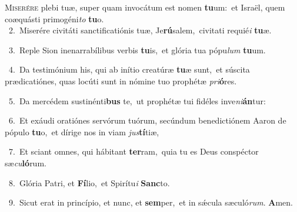 \lettrine{\initial\textcolor{\initialcolor}{M}}{iserére} plebi tuæ, super quam invocátum est nomen \textbf{tu}\-um:~\star et Israël, quem coæquásti primogéni\textit{to} \textbf{tu}\-o.\\
{\numbfont\textcolor{\numbcolor}{~2.}}~Miserére civitáti sanctificatiónis tuæ, Je\-\textbf{rú}\-salem,~\star civitati requié\textit{i} \textbf{tu}\-æ.\par
{\numbfont\textcolor{\numbcolor}{~3.}}~Reple Sion inenarrabílibus verbis \textbf{tu}\-is,~\star et glória tua pópu\textit{lum} \textbf{tu}\-um.\par
{\numbfont\textcolor{\numbcolor}{~4.}}~Da testimónium his, qui ab inítio creatúræ \textbf{tu}\-æ sunt,~\star et súscita prædicatiónes, quas locúti sunt in nómine tuo prophétæ \textit{pri}\-\textbf{ó}res.\par
{\numbfont\textcolor{\numbcolor}{~5.}}~Da mercédem sustinénti\textbf{bus} te,~\star ut prophétæ tui fidéles inve\-\textit{ni}\-\textbf{án}tur:\par
{\numbfont\textcolor{\numbcolor}{~6.}}~Et exáudi oratiónes servórum tuórum, secúndum benedictiónem Aaron de pópulo \textbf{tu}\-o,~\star et dírige nos in viam \textit{jus}\-\textbf{tí}tiæ,\par
{\numbfont\textcolor{\numbcolor}{~7.}}~Et sciant omnes, qui hábitant \textbf{ter}\-ram,~\star quia tu es Deus conspéctor sæ\-\textit{cu}\-\textbf{ló}rum.\par
{\numbfont\textcolor{\numbcolor}{~8.}}~Glória Patri, et \textbf{Fí}\-lio,~\star et Spirítu\textit{i} \textbf{Sanc}\-to.\par
{\numbfont\textcolor{\numbcolor}{~9.}}~Sicut erat in princípio, et nunc, et \textbf{sem}\-per,~\star et in sǽcula sæculó\-\textit{rum}\-. \textbf{A}\-men.\par
